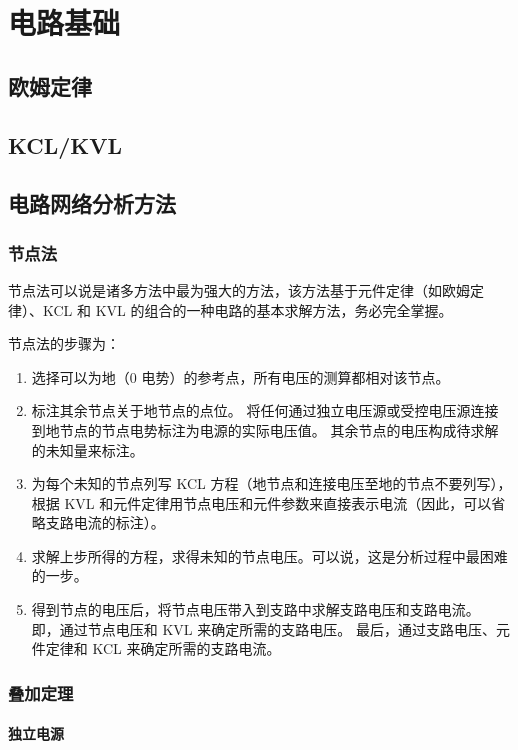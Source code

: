 \chapter{电路基础}

\section{欧姆定律}

\section{KCL/KVL}

\section{电路网络分析方法}

\subsection{节点法}

节点法可以说是诸多方法中最为强大的方法，该方法基于元件定律（如欧姆定律）、KCL 和 KVL 的组合的一种电路的基本求解方法，务必完全掌握。

节点法的步骤为：
\begin{enumerate}
  \item 选择可以为地（0 电势）的参考点，所有电压的测算都相对该节点。
  \item 标注其余节点关于地节点的点位。
    将任何通过独立电压源或受控电压源连接到地节点的节点电势标注为电源的实际电压值。
    其余节点的电压构成待求解的未知量来标注。
  \item 为每个未知的节点列写 KCL 方程（地节点和连接电压至地的节点不要列写），根据 KVL 和元件定律用节点电压和元件参数来直接表示电流（因此，可以省略支路电流的标注）。
  \item 求解上步所得的方程，求得未知的节点电压。可以说，这是分析过程中最困难的一步。
  \item 得到节点的电压后，将节点电压带入到支路中求解支路电压和支路电流。
    即，通过节点电压和 KVL 来确定所需的支路电压。
    最后，通过支路电压、元件定律和 KCL 来确定所需的支路电流。
\end{enumerate}

\subsection{叠加定理}

\subsubsection{独立电源}

